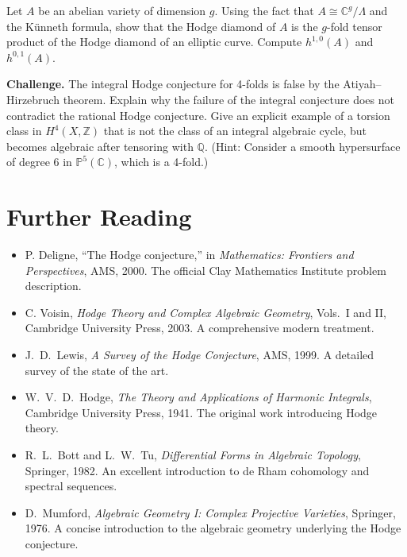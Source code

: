 \begin{exercise}
Let $A$ be an abelian variety of dimension $g$. Using the fact that $A \cong \mathbb{C}^g / \Lambda$ and the Künneth formula, show that the Hodge diamond of $A$ is the $g$-fold tensor product of the Hodge diamond of an elliptic curve. Compute $h^{1,0}(A)$ and $h^{0,1}(A)$.
\end{exercise}

\begin{exercise}
\textbf{Challenge.} The integral Hodge conjecture for 4-folds is false by the Atiyah--Hirzebruch theorem. Explain why the failure of the integral conjecture does not contradict the rational Hodge conjecture. Give an explicit example of a torsion class in $H^4(X, \mathbb{Z})$ that is not the class of an integral algebraic cycle, but becomes algebraic after tensoring with $\mathbb{Q}$. (Hint: Consider a smooth hypersurface of degree 6 in $\mathbb{P}^5(\mathbb{C})$, which is a 4-fold.)
\end{exercise}

\section{Further Reading}

\begin{itemize}
\item P. Deligne, ``The Hodge conjecture,'' in \textit{Mathematics: Frontiers and Perspectives}, AMS, 2000. The official Clay Mathematics Institute problem description.
\item C. Voisin, \textit{Hodge Theory and Complex Algebraic Geometry}, Vols.\ I and II, Cambridge University Press, 2003. A comprehensive modern treatment.
\item J.\ D.\ Lewis, \textit{A Survey of the Hodge Conjecture}, AMS, 1999. A detailed survey of the state of the art.
\item W.\ V.\ D.\ Hodge, \textit{The Theory and Applications of Harmonic Integrals}, Cambridge University Press, 1941. The original work introducing Hodge theory.
\item R.\ L.\ Bott and L.\ W.\ Tu, \textit{Differential Forms in Algebraic Topology}, Springer, 1982. An excellent introduction to de Rham cohomology and spectral sequences.
\item D.\ Mumford, \textit{Algebraic Geometry I: Complex Projective Varieties}, Springer, 1976. A concise introduction to the algebraic geometry underlying the Hodge conjecture.
\end{itemize}

